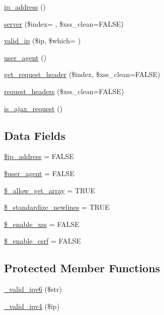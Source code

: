 \begin{DoxyCompactItemize}
\item 
\hyperlink{class_c_i___input_aec2f772317b4fb79cc696412c2e455c3}{ip\+\_\+address} ()
\item 
\hyperlink{class_c_i___input_ae51c4a35daae69cbec7a25a5309918d9}{server} (\$index= \textquotesingle{}\textquotesingle{}, \$xss\+\_\+clean=F\+A\+L\+SE)
\item 
\hyperlink{class_c_i___input_a2adf8f23c98fcdafdc7588f874db4c4d}{valid\+\_\+ip} (\$ip, \$which= \textquotesingle{}\textquotesingle{})
\item 
\hyperlink{class_c_i___input_a638069c4ba0d3f4209c6936e5282f170}{user\+\_\+agent} ()
\item 
\hyperlink{class_c_i___input_a099af71b54f9edbfb20576a4e8a3df41}{get\+\_\+request\+\_\+header} (\$index, \$xss\+\_\+clean=F\+A\+L\+SE)
\item 
\hyperlink{class_c_i___input_a4bc8f8c9a9488ff359a61f1fb60e6097}{request\+\_\+headers} (\$xss\+\_\+clean=F\+A\+L\+SE)
\item 
\hyperlink{class_c_i___input_a4ae07120b0b2ace90eb2f7ec72b29426}{is\+\_\+ajax\+\_\+request} ()
\end{DoxyCompactItemize}
\subsection*{Data Fields}
\begin{DoxyCompactItemize}
\item 
\hyperlink{class_c_i___input_a614e10d1ab6dcf06fa7fef37af7b7eee}{\$ip\+\_\+address} = F\+A\+L\+SE
\item 
\hyperlink{class_c_i___input_aeea73d2dc27fea041fbcadae59f07cd5}{\$user\+\_\+agent} = F\+A\+L\+SE
\item 
\hyperlink{class_c_i___input_a359b1debb6f1d80e345d6215af6946fb}{\$\+\_\+allow\+\_\+get\+\_\+array} = T\+R\+UE
\item 
\hyperlink{class_c_i___input_ad9ebdfce8f992b3a41aaf64ea8782933}{\$\+\_\+standardize\+\_\+newlines} = T\+R\+UE
\item 
\hyperlink{class_c_i___input_a42b707bea5d9604a7460e953d9e39d7d}{\$\+\_\+enable\+\_\+xss} = F\+A\+L\+SE
\item 
\hyperlink{class_c_i___input_a463c89c07e7cf7f5e4337a2a8e460d17}{\$\+\_\+enable\+\_\+csrf} = F\+A\+L\+SE
\end{DoxyCompactItemize}
\subsection*{Protected Member Functions}
\begin{DoxyCompactItemize}
\item 
\hyperlink{class_c_i___input_a25d7802ebfe7e908ea45310013a24723}{\+\_\+valid\+\_\+ipv6} (\$str)
\item 
\hyperlink{class_c_i___input_acc1814d63877524ba3434eca5453edf0}{\+\_\+valid\+\_\+ipv4} (\$ip)
\end{DoxyCompactItemize}
